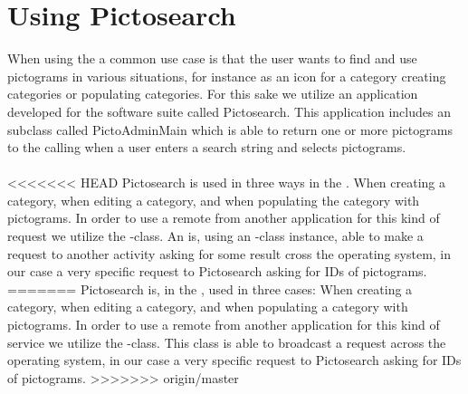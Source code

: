 
\section{Using Pictosearch}
\label{sec:using_pictosearch}


When using the \ct a common use case is that the user wants to find and use pictograms in various situations, for instance as an icon for a category creating categories or populating categories. For this sake we utilize an application developed for the \giraf software suite called Pictosearch. This application includes an  subclass called PictoAdminMain  which is able to return one or more pictograms to the calling  when a user enters a search string and selects pictograms. 
\\\\
<<<<<<< HEAD
Pictosearch is used in three ways in the \ct. When creating a category, when editing a category, and when populating the category with pictograms. In order to use a remote  from another application for this kind of request we utilize the -class. An  is, using an -class instance, able to make a request to another activity asking for some result cross the operating system, in our case a very specific request to Pictosearch asking for IDs of pictograms. 
=======
Pictosearch is, in the \ct, used in three cases: When creating a category, when editing a category, and when populating a category with pictograms. In order to use a remote  from another application for this kind of service we utilize the -class. This class is able to broadcast a request across the operating system, in our case a very specific request to Pictosearch asking for IDs of pictograms. 
>>>>>>> origin/master



